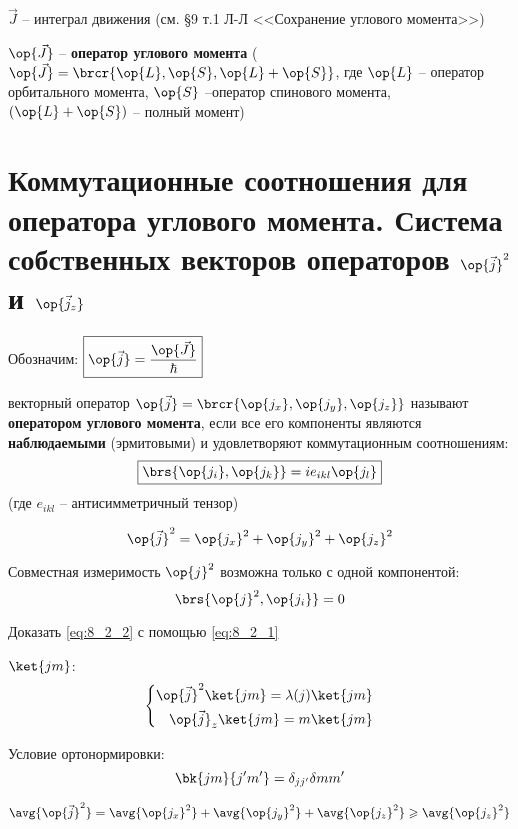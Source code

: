 $\vec{J}$ -- интеграл движения (см. \S 9 т.1 Л-Л <<Сохранение углового момента>>)

$\op{\vec{J}}$ -- \textbf{оператор углового момента} ($\op{\vec{J}} = \brcr{\op{L}, \op{S}, \op{L}+\op{S}}$, где $\op{L}$ -- оператор орбитального момента, $\op{S}$ --оператор спинового момента, $(\op{L} + \op{S})$ -- полный момент)


\section{Коммутационные соотношения для оператора углового момента. Система собственных векторов операторов $\op{\vec{j}}^2$ и $\op{\vec{j}_z}$}

Обозначим: $\boxed{\op{\vec{j}} = \frac{\op{\vec{J}}}{\hbar}}$

\begin{defn}
векторный оператор $\op{\vec{j}} = \brcr{\op{j_x}, \op{j_y}, \op{j_z}}$ называют \textbf{оператором углового момента}, если все его компоненты являются \textbf{наблюдаемыми} (эрмитовыми) и удовлетворяют коммутационным соотношениям:
\begin{equation}
\label{eq:8_2_1}
\boxed {
	\brs{\op{j_i}, \op{j_k}} = i e_{ikl} \op{j_l}
}
\end{equation}
(где $e_{ikl}$ -- антисимметричный тензор)
\end{defn}

$$
\op{\vec{j}}^2 = \op{j_x}^2 + \op{j_y}^2 + \op{j_z}^2
$$

Совместная измеримость $\op{j}^2$ возможна только с одной компонентой:
\begin{equation}
\label{eq:8_2_2}
\brs{\op{j}^2, \op{j_i}} = 0
\end{equation}

\begin{excr}
Доказать \eqref{eq:8_2_2} с помощью \eqref{eq:8_2_1}
\end{excr}

$\ket{jm}$:
\begin{equation}
\label{eq:8_2_3}
\left\{
\begin{aligned}
\op{\vec{j}}^2 \ket{jm} = \lambda(j) \ket{jm} \\
\op{\vec{j}}_z \ket{jm} = m \ket{jm}
\end{aligned}
\right.
\end{equation}

Условие ортонормировки:
$$
\bk{jm}{j'm'} = \delta_{jj'} \delta{mm'}
$$

$$
\avg{\op{\vec{j}}^2} = \avg{\op{j_x}^2} + \avg{\op{j_y}^2} + \avg{\op{j_z}^2} \geqslant \avg{\op{j_z}^2}
$$

